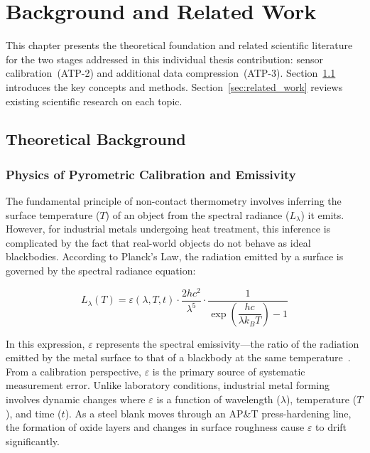 \chapter{Background and Related Work}
\label{cha:background}

This chapter presents the theoretical foundation and related scientific literature for the two stages addressed in this individual thesis contribution: sensor calibration~(ATP-2) and additional data compression~(ATP-3). Section~\ref{sec:background} introduces the key concepts and methods. Section~\ref{sec:related_work} reviews existing scientific research on each topic.

\section{Theoretical Background}
\label{sec:background}

\subsection{Physics of Pyrometric Calibration and Emissivity}

The fundamental principle of non-contact thermometry involves inferring the surface temperature ($T$) of an object from the spectral radiance ($L_\lambda$) it emits. However, for industrial metals undergoing heat treatment, this inference is complicated by the fact that real-world objects do not behave as ideal blackbodies. According to Planck's Law, the radiation emitted by a surface is governed by the spectral radiance equation:

\begin{equation}
L_\lambda(T) = \varepsilon(\lambda, T, t) \cdot \frac{2hc^2}{\lambda^5} \cdot \frac{1}{\exp\!\left(\dfrac{hc}{\lambda k_B T}\right) - 1}
\label{eq:planck_emissivity}
\end{equation}

In this expression, $\varepsilon$ represents the spectral emissivity—the ratio of the radiation emitted by the metal surface to that of a blackbody at the same temperature~\cite{emissivity_measurement}. From a calibration perspective, $\varepsilon$ is the primary source of systematic measurement error. Unlike laboratory conditions, industrial metal forming involves dynamic changes where $\varepsilon$ is a function of wavelength ($\lambda$), temperature ($T$), and time ($t$). As a steel blank moves through an AP\&T press-hardening line, the formation of oxide layers and changes in surface roughness cause $\varepsilon$ to drift significantly.


